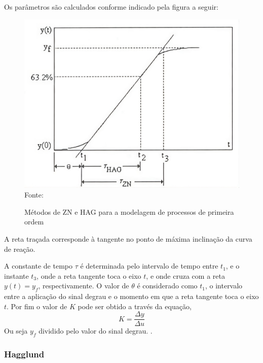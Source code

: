 Os parâmetros são calculados conforme indicado pela figura a seguir:
\begin{figure}[H]
    \centering
    \caption{Métodos de ZN e HAG para a modelagem de processos de primeira ordem}
    \includegraphics[scale=0.3]{figuras/zn_hg_ident_meth}
    \label{fig:zn_hg_ident_meth}
    \\
    \vspace{0cm}\hspace{0cm}\small{Fonte: \cite{CoelhoIdentificacao}}
\end{figure}

A reta traçada corresponde à tangente no ponto de máxima inclinação da curva de reação.

A constante de tempo $\tau$ é determinada pelo intervalo de tempo entre $t_1$, e o instante
$t_3$, onde a reta tangente toca o eixo $t$, e onde cruza com a reta $y(t) = y_f$,
respectivamente.
O valor de  $\theta$ é considerado como $t_1$, o intervalo entre a aplicação do sinal degrau e o
momento em que a reta tangente toca o eixo $t$.
Por fim o valor de $K$ pode ser obtido a través da equação,
\begin{equation}
    \label{eq:dydu}
    K = \frac{\Delta y}{\Delta u}
\end{equation}
Ou seja $y_f$ dividido pelo valor do sinal degrau. \cite{CoelhoIdentificacao}.

\subsubsection{Hagglund}

